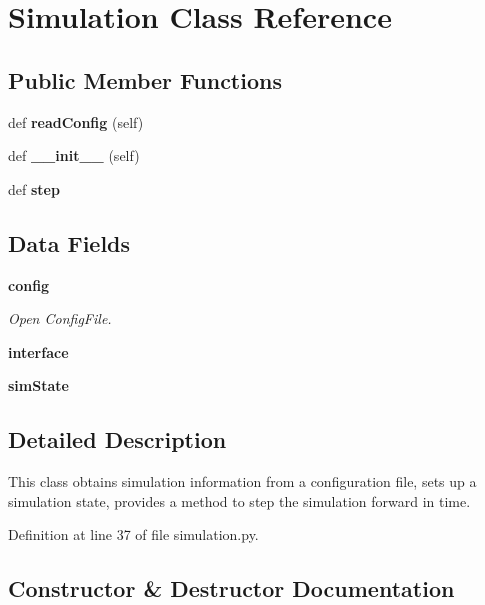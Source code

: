 \section{Simulation Class Reference}
\label{classsims_1_1rtutank_1_1simulation_1_1_simulation}
\subsection*{Public Member Functions}
\begin{DoxyCompactItemize}
\item 
def {\bf read\+Config} (self)
\item 
def {\bf \+\_\+\+\_\+init\+\_\+\+\_\+} (self)
\item 
def {\bf step}
\end{DoxyCompactItemize}
\subsection*{Data Fields}
\begin{DoxyCompactItemize}
\item 
{\bf config}
\begin{DoxyCompactList}\small\item\em Open Config\+File. \end{DoxyCompactList}\item 
{\bf interface}
\item 
{\bf sim\+State}
\end{DoxyCompactItemize}


\subsection{Detailed Description}
\begin{DoxyVerb}This class obtains simulation information from a configuration file,
    sets up a simulation state, provides a method to step the simulation
    forward in time.\end{DoxyVerb}
 

Definition at line 37 of file simulation.\+py.



\subsection{Constructor \& Destructor Documentation}
